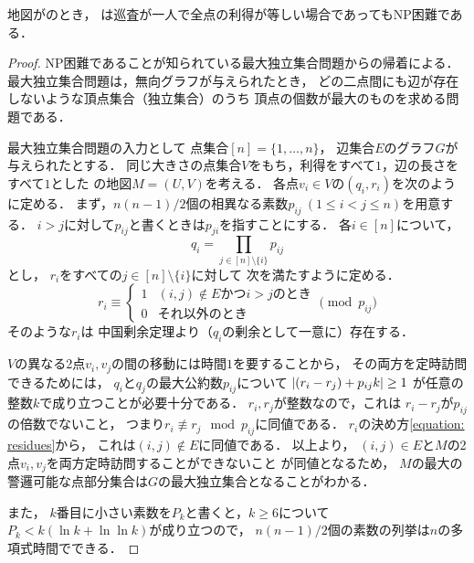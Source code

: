 \begin{theo}
  \label{theo:UnitExacIdletimeNPhard}
  地図が{\graphUnit}のとき，
  {\timeSpecifiedPPProfit}は巡査が一人で全点の利得が等しい場合であってもNP困難である．
\end{theo}
\begin{proof}
  NP困難であることが知られている最大独立集合問題からの帰着による．
  最大独立集合問題は，無向グラフが与えられたとき，
  どの二点間にも辺が存在しないような頂点集合（独立集合）のうち
  頂点の個数が最大のものを求める問題である．

  \newcommand{\primenum}[2]{p_{{#1}{#2}}}
  最大独立集合問題の入力として
  点集合$[n] = \{1, \ldots, n\}$，
  辺集合$E$のグラフ$G$が与えられたとする．
  同じ大きさの点集合$V$をもち，利得をすべて$1$，辺の長さをすべて$1$とした
  {\graphUnit}の地図$M = (U, V)$を考える．
  各点$v_i \in V$の{\exactTime}$(q_i, r_i)$を次のように定める．
  まず，$n(n - 1)/2$個の相異なる素数$\primenum{i}{j}\ (1 \leq i < j \leq n)$を用意する．
  $i > j$に対して$\primenum{i}{j}$と書くときは$\primenum{j}{i}$を指すことにする．
  各$i \in [n]$について，
  \begin{equation}
    q_i = \prod_{j \in [n] \setminus \{i\}} \primenum{i}{j}
  \end{equation}
  とし，
  $r _i$をすべての$j \in [n] \setminus \{i\}$に対して
  次を満たすように定める．
  \begin{equation}
    \label{equation: residues}
    r _i
    \equiv
    \begin{cases}
      1 & \text{$(i, j) \notin E$かつ$i > j$のとき} \\
      0 & \text{それ以外のとき}
    \end{cases}
    \pmod{\primenum{i}{j}}
  \end{equation}
  そのような$r _i$は
  中国剰余定理より（$q _i$の剰余として一意に）存在する．

  $V$の異なる2点$v_i, v_j$の間の移動には時間$1$を要することから，
  その両方を定時訪問できるためには，
  $q_i$と$q_j$の最大公約数$\primenum{i}{j}$について
  $\abs{(r_i - r_j) + \primenum{i}{j} k} \geq 1$%
  が任意の整数$k$で成り立つことが必要十分である．
  $r_i, r_j$が整数なので，これは
  $r_i - r_j$が$\primenum{i}{j}$の倍数でないこと，
  つまり$r_i \not\equiv r_j \mod \primenum{i}{j}$に同値である．
  $r_i$の決め方\eqref{equation: residues}から，
  これは$(i, j) \notin E$に同値である．
  以上より，
  $(i, j) \in E$と$M$の2点$v_i, v_j$を両方定時訪問することができないこと
  が同値となるため，
  $M$の最大の警邏可能な点部分集合は$G$の最大独立集合となることがわかる．

  また，
  $k$番目に小さい素数を$P_k$と書くと，$k \geq 6$について
  $P_k < k( \ln k + \ln\ln k )$が成り立つ\cite[Lemma~1]{dusart1999k}ので，
  $n(n - 1)/2$個の素数の列挙は$n$の多項式時間でできる．
\end{proof}

